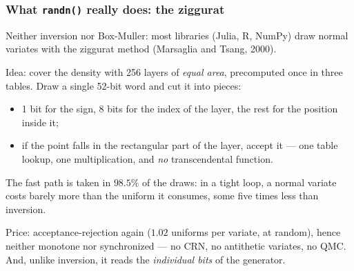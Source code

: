 \documentclass[aspectratio=169]{beamer}
\def\blue{\color{blue}}
\def\red{\color{red}}
\begin{document}
\begin{frame}
\frametitle{What \texttt{randn()} really does: the ziggurat}

Neither inversion nor Box-Muller: most libraries (Julia, R, NumPy) draw normal variates with
the {\blue ziggurat} method (Marsaglia and Tsang, 2000).

\vspace{0.2cm}

{\red Idea}: cover the density with 256 layers of \emph{equal area}, precomputed once in three
tables. Draw a single 52-bit word and cut it into pieces:
\begin{itemize}
\item 1 bit for the sign, 8 bits for the index of the layer, the rest for the position inside it;
\item if the point falls in the rectangular part of the layer, accept it --- one table lookup, one
multiplication, and \emph{no} transcendental function.
\end{itemize}

The fast path is taken in $98.5\%$ of the draws: in a tight loop, a normal variate costs barely
more than the uniform it consumes, some five times less than inversion.

\vspace{0.2cm}

{\red Price}: acceptance-rejection again ($1.02$ uniforms per variate, at random), hence neither
monotone nor synchronized --- no CRN, no antithetic variates, no QMC. And, unlike inversion, it
reads the \emph{individual bits} of the generator.

\end{frame}
\end{document}
